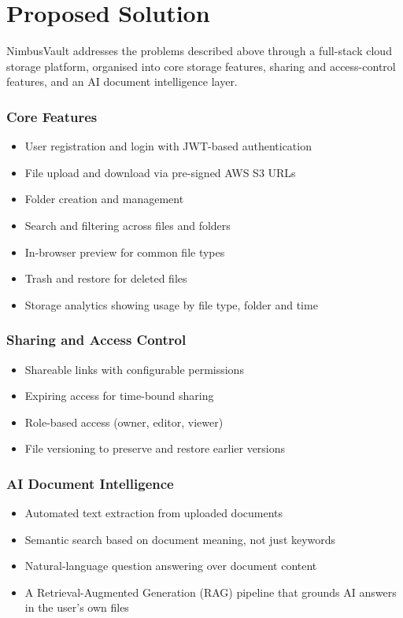 \documentclass[11pt,a4paper,oneside]{report}
\begin{document}
\chapter{Proposed Solution}

NimbusVault addresses the problems described above through a full-stack cloud storage platform, organised into core storage features, sharing and access-control features, and an AI document intelligence layer.

\subsection{Core Features}
\begin{itemize}[leftmargin=1.2cm, itemsep=3pt]
    \item User registration and login with JWT-based authentication
    \item File upload and download via pre-signed AWS S3 URLs
    \item Folder creation and management
    \item Search and filtering across files and folders
    \item In-browser preview for common file types
    \item Trash and restore for deleted files
    \item Storage analytics showing usage by file type, folder and time
\end{itemize}

\subsection{Sharing and Access Control}
\begin{itemize}[leftmargin=1.2cm, itemsep=3pt]
    \item Shareable links with configurable permissions
    \item Expiring access for time-bound sharing
    \item Role-based access (owner, editor, viewer)
    \item File versioning to preserve and restore earlier versions
\end{itemize}

\subsection{AI Document Intelligence}
\begin{itemize}[leftmargin=1.2cm, itemsep=3pt]
    \item Automated text extraction from uploaded documents
    \item Semantic search based on document meaning, not just keywords
    \item Natural-language question answering over document content
    \item A Retrieval-Augmented Generation (RAG) pipeline that grounds AI answers in the user's own files
\end{itemize}
\end{document}
